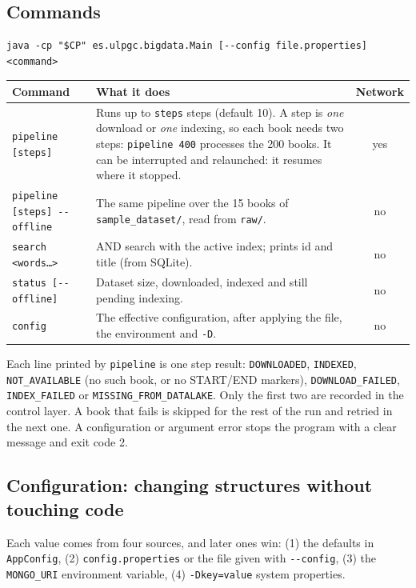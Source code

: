 \documentclass[11pt,a4paper]{article}
\newcommand{\code}[1]{\texttt{#1}}
\begin{document}
\subsection{Commands}
\begin{lstlisting}[style=shell]
java -cp "$CP" es.ulpgc.bigdata.Main [--config file.properties] <command>
\end{lstlisting}
\begin{table}[H]
\centering\small
\begin{tabularx}{\linewidth}{@{}l Y c@{}}
\toprule
Command & What it does & Network \\
\midrule
\code{pipeline [steps]} & Runs up to \code{steps} steps (default 10). A step is \emph{one} download or \emph{one} indexing, so each book needs two steps: \code{pipeline 400} processes the 200 books. It can be interrupted and relaunched: it resumes where it stopped. & yes \\
\code{pipeline [steps] -{}-offline} & The same pipeline over the 15 books of \code{sample\_dataset/}, read from \code{raw/}. & no \\
\code{search <words\ldots>} & AND search with the active index; prints id and title (from SQLite). & no \\
\code{status [-{}-offline]} & Dataset size, downloaded, indexed and still pending indexing. & no \\
\code{config} & The effective configuration, after applying the file, the environment and \code{-D}. & no \\
\bottomrule
\end{tabularx}
\end{table}

Each line printed by \code{pipeline} is one step result: \code{DOWNLOADED}, \code{INDEXED},
\code{NOT\_AVAILABLE} (no such book, or no START/END markers), \code{DOWNLOAD\_FAILED},
\code{INDEX\_FAILED} or \code{MISSING\_FROM\_DATALAKE}. Only the first two are recorded in the
control layer. A book that fails is skipped for the rest of the run and retried in the next one.
A configuration or argument error stops the program with a clear message and exit code 2.

\subsection{Configuration: changing structures without touching code}
Each value comes from four sources, and later ones win: (1) the defaults in \code{AppConfig},
(2) \code{config.properties} or the file given with \code{-{}-config}, (3) the \code{MONGO\_URI}
environment variable, (4) \code{-Dkey=value} system properties.
\end{document}
